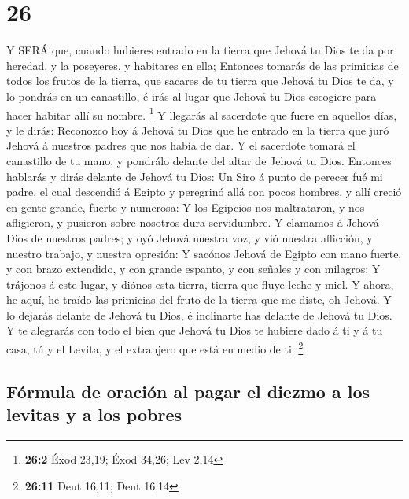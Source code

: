 \hypertarget{section-25}{%
\section{26}\label{section-25}}

 Y SERÁ que, cuando hubieres entrado en la tierra que Jehová
tu Dios te da por heredad, y la poseyeres, y habitares en ella;
 Entonces tomarás de las primicias de todos los frutos de la
tierra, que sacares de tu tierra que Jehová tu Dios te da, y lo pondrás
en un canastillo, é irás al lugar que Jehová tu Dios escogiere para
hacer habitar allí su nombre. \footnote{\textbf{26:2} Éxod 23,19; Éxod
  34,26; Lev 2,14}  Y llegarás al sacerdote que fuere en
aquellos días, y le dirás: Reconozco hoy á Jehová tu Dios que he entrado
en la tierra que juró Jehová á nuestros padres que nos había de dar.
 Y el sacerdote tomará el canastillo de tu mano, y pondrálo
delante del altar de Jehová tu Dios.  Entonces hablarás y
dirás delante de Jehová tu Dios: Un Siro á punto de perecer fué mi
padre, el cual descendió á Egipto y peregrinó allá con pocos hombres, y
allí creció en gente grande, fuerte y numerosa:  Y los
Egipcios nos maltrataron, y nos afligieron, y pusieron sobre nosotros
dura servidumbre.  Y clamamos á Jehová Dios de nuestros
padres; y oyó Jehová nuestra voz, y vió nuestra aflicción, y nuestro
trabajo, y nuestra opresión:  Y sacónos Jehová de Egipto con
mano fuerte, y con brazo extendido, y con grande espanto, y con señales
y con milagros:  Y trájonos á este lugar, y diónos esta
tierra, tierra que fluye leche y miel.  Y ahora, he aquí,
he traído las primicias del fruto de la tierra que me diste, oh Jehová.
Y lo dejarás delante de Jehová tu Dios, é inclinarte has delante de
Jehová tu Dios.  Y te alegrarás con todo el bien que Jehová
tu Dios te hubiere dado á ti y á tu casa, tú y el Levita, y el
extranjero que está en medio de ti. \footnote{\textbf{26:11} Deut 16,11;
  Deut 16,14}

\hypertarget{fuxf3rmula-de-oraciuxf3n-al-pagar-el-diezmo-a-los-levitas-y-a-los-pobres}{%
\subsection{Fórmula de oración al pagar el diezmo a los levitas y a los
pobres}\label{fuxf3rmula-de-oraciuxf3n-al-pagar-el-diezmo-a-los-levitas-y-a-los-pobres}}

